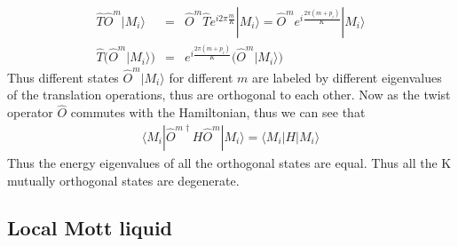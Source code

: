 \documentclass[reprint,prb,superscriptaddress]{revtex4-2}
\begin{document}
\begin{eqnarray}
\hat{T} \hat{O}^m |M_i\rangle &=& \hat{O}^m \hat{T} e^{i2\pi \frac{m}{K}} |M_i\rangle =\hat{O}^m e^{i \frac{2\pi(m+p_i)}{K} } |M_i\rangle \nonumber\\
\hat{T} \bigg(\hat{O}^m |M_i\rangle \bigg) &=&  e^{i \frac{2\pi(m+p_i)}{K} } \bigg( \hat{O}^m |M_i\rangle \bigg)
\end{eqnarray}
Thus different states $ \hat{O}^m |M_i\rangle$ for different $m$ are labeled by different eigenvalues of the translation operations, thus are orthogonal to each other. Now as the twist operator $\hat{O}$ commutes with the Hamiltonian, thus we can see that 
\begin{eqnarray}
\langle M_i| \hat{O}^{m \dagger}  H \hat{O}^m |M_i\rangle =\langle M_i|  H |M_i\rangle 
\end{eqnarray}
Thus the energy eigenvalues of all the orthogonal states are equal. Thus all the K mutually orthogonal states are degenerate.





\subsection{Local Mott liquid}
\end{document}
